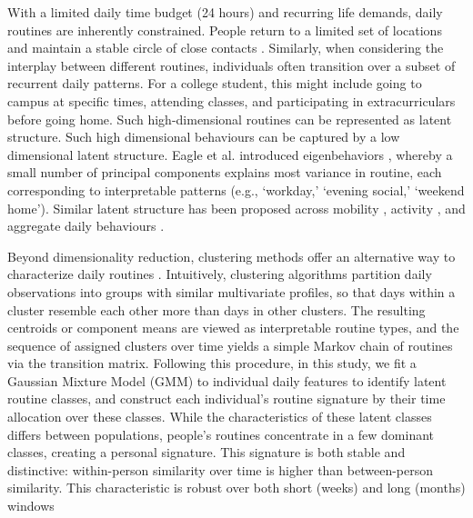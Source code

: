 \documentclass[pdflatex,sn-vancouver,Numbered]{bst/sn-jnl}%
\theoremstyle{thmstyleone}%
\theoremstyle{thmstyletwo}%
\theoremstyle{thmstylethree}%
\begin{document}
With a limited daily time budget (24 hours) and recurring life demands, daily routines are inherently constrained. People return to a limited set of locations \cite{alessandrettiUnderstandingInterplaySocial2018} and maintain a stable circle of close contacts \cite{saramaki2014persistence}. Similarly, when considering the interplay between different routines, individuals often transition over a subset of recurrent daily patterns. For a college student, this might include going to campus at specific times, attending classes, and participating in extracurriculars before going home. Such high-dimensional routines can be represented as latent structure. Such high dimensional behaviours can be captured by a low dimensional latent structure. Eagle et al. introduced eigenbehaviors \cite{eagleEigenbehaviorsIdentifyingStructure2009a}, whereby a small number of principal components explains most variance in routine, each corresponding to interpretable patterns (e.g., ‘workday,’ ‘evening social,’ ‘weekend home’). Similar latent structure has been proposed across mobility \cite{jiangClusteringDailyPatterns2012, farrahiDiscoveringRoutinesLargescale2011}, activity \cite{yangIdentifyingLatentActivity2023a}, and aggregate daily behaviours \cite{aledavood2022quantifying, girardiniAdaptationStudentBehavioural2023a, farrahiWhatDidYou2008}.

Beyond dimensionality reduction, clustering methods offer an alternative way to characterize daily routines \cite{kasDigitalBehaviouralSignatures2024, zhou2022predicting, yan2025relapse}. Intuitively, clustering algorithms partition daily observations into groups with similar multivariate profiles, so that days within a cluster resemble each other more than days in other clusters. The resulting centroids or component means are viewed as interpretable routine types, and the sequence of assigned clusters over time yields a simple Markov chain of routines via the transition matrix. Following this procedure, in this study, we fit a Gaussian Mixture Model (GMM) to individual daily features to identify latent routine classes, and construct each individual’s routine signature by their time allocation over these classes. While the characteristics of these latent classes differs between populations, people’s routines concentrate in a few dominant classes, creating a personal signature. This signature is both stable and distinctive: within-person similarity over time is higher than between-person similarity. This characteristic is robust over both short (weeks) and long (months) windows
\end{document}
